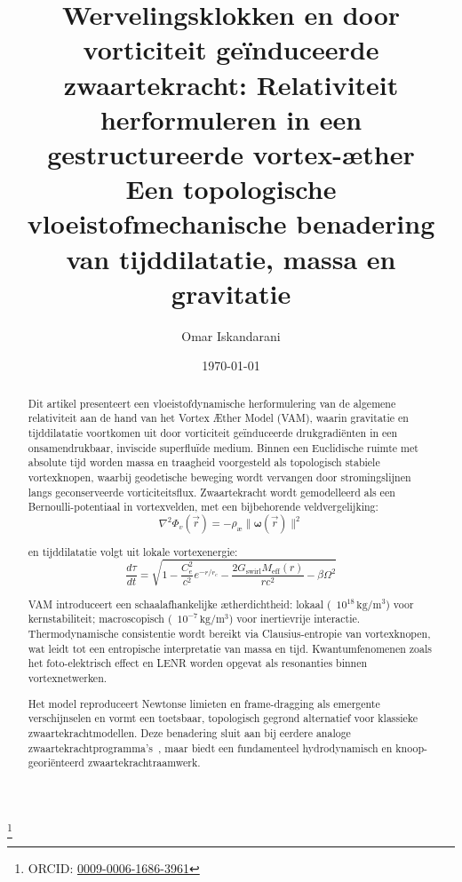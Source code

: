 \documentclass[a4paper, aps,preprint,superscriptaddress, 12pt]{revtex4}
\begin{document}
    \author{Omar Iskandarani}
    \title{
        Wervelingsklokken en door vorticiteit geïnduceerde zwaartekracht:
        Relativiteit herformuleren in een gestructureerde vortex-æther\\
        \textnormal{\normalsize Een topologische vloeistofmechanische benadering van tijddilatatie, massa en gravitatie}
    }

    \date{\today}
    \thanks{ORCID: \href{https://orcid.org/0009-0006-1686-3961}{0009-0006-1686-3961}}


    \begin{abstract}
        Dit artikel presenteert een vloeistofdynamische herformulering van de algemene relativiteit aan de hand van het Vortex Æther Model (VAM), waarin gravitatie en tijddilatatie voortkomen uit door vorticiteit geïnduceerde drukgradiënten in een onsamendrukbaar, inviscide superfluïde medium. Binnen een Euclidische ruimte met absolute tijd worden massa en traagheid voorgesteld als topologisch stabiele vortexknopen, waarbij geodetische beweging wordt vervangen door stromingslijnen langs geconserveerde vorticiteitsflux.
        Zwaartekracht wordt gemodelleerd als een Bernoulli-potentiaal in vortexvelden, met een bijbehorende veldvergelijking:
        \begin{equation*}
            \nabla^2 \Phi_v(\vec{r}) = -\rho_\text{\ae} \|\boldsymbol{\omega}(\vec{r})\|^2
        \end{equation*}

        en tijddilatatie volgt uit lokale vortexenergie:
        \begin{equation*}
            \frac{d\tau}{dt} = \sqrt{1 - \frac{C_e^2}{c^2} e^{-r/r_c} - \frac{2G_\text{swirl} M_\text{eff}(r)}{rc^2} - \beta \Omega^2}
        \end{equation*}

        VAM introduceert een schaalafhankelijke ætherdichtheid: lokaal (~$10^{18}\,\mathrm{kg/m^3}$) voor kernstabiliteit; macroscopisch (~$10^{-7}\,\mathrm{kg/m^3}$) voor inertievrije interactie. Thermodynamische consistentie wordt bereikt via Clausius-entropie van vortexknopen, wat leidt tot een entropische interpretatie van massa en tijd. Kwantumfenomenen zoals het foto-elektrisch effect en LENR worden opgevat als resonanties binnen vortexnetwerken.

        Het model reproduceert Newtonse limieten en frame-dragging als emergente verschijnselen en vormt een toetsbaar, topologisch gegrond alternatief voor klassieke zwaartekrachtmodellen. Deze benadering sluit aan bij eerdere analoge zwaartekrachtprogramma’s~\cite{barcelo2011analogue,volovik2009universe}, maar biedt een fundamenteel hydrodynamisch en knoop-georiënteerd zwaartekrachtraamwerk.
    \end{abstract}
\end{document}
